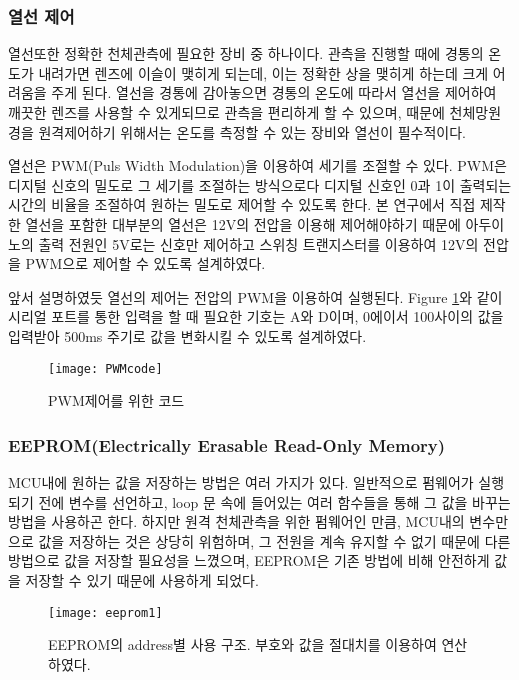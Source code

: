 \subsubsection{열선 제어}
열선또한 정확한 천체관측에 필요한 장비 중 하나이다. 관측을 진행할 때에 경통의 온도가 내려가면 렌즈에 이슬이 맺히게 되는데, 이는 정확한 상을 맺히게 하는데 크게 어려움을 주게 된다. 열선을 경통에 감아놓으면 경통의 온도에 따라서 열선을 제어하여 깨끗한 렌즈를 사용할 수 있게되므로 관측을 편리하게 할 수 있으며, 때문에 천체망원경을 원격제어하기 위해서는 온도를 측정할 수 있는 장비와 열선이 필수적이다. 

열선은 PWM(Puls Width Modulation)을 이용하여 세기를 조절할 수 있다. PWM은 디지털 신호의 밀도로 그 세기를 조절하는 방식으로다 디지털 신호인 0과 1이 출력되는 시간의 비율을 조절하여 원하는 밀도로 제어할 수 있도록 한다. 본 연구에서 직접 제작한 열선을 포함한 대부분의 열선은 12V의 전압을 이용해 제어해야하기 때문에 아두이노의 출력 전원인 5V로는 신호만 제어하고 스위칭 트랜지스터를 이용하여 12V의 전압을 PWM으로 제어할 수 있도록 설계하였다.


앞서 설명하였듯 열선의 제어는 전압의 PWM을 이용하여 실행된다. \textrm{Figure} \ref{PWM}와 같이 시리얼 포트를 통한 입력을 할 때 필요한 기호는 A와 D이며, 0에이서 100사이의 값을 입력받아 500ms 주기로 값을 변화시킬 수 있도록 설계하였다.

\begin{figure}[ht]
	\begin{center}
		\texttt{[image: PWMcode]}
	\end{center}
	\caption{PWM제어를 위한 코드}
	\label{PWM}
\end{figure}

\subsubsection{EEPROM(Electrically Erasable Read-Only Memory)}

MCU내에 원하는 값을 저장하는 방법은 여러 가지가 있다. 일반적으로 펌웨어가 실행되기 전에 변수를 선언하고, loop 문 속에 들어있는 여러 함수들을 통해 그 값을 바꾸는 방법을 사용하곤 한다. 하지만 원격 천체관측을 위한 펌웨어인 만큼, MCU내의 변수만으로 값을 저장하는 것은 상당히 위험하며, 그 전원을 계속 유지할 수 없기 때문에 다른 방법으로 값을 저장할 필요성을 느꼈으며, EEPROM은 기존 방법에 비해 안전하게 값을 저장할 수 있기 때문에 사용하게 되었다.


\begin{figure}[h]
	\begin{center}
		\texttt{[image: eeprom1]}
	\end{center}
	\caption{EEPROM의 address별 사용 구조. 부호와 값을 절대치를 이용하여 연산하였다.}
	\label{eeprom1}
\end{figure}

